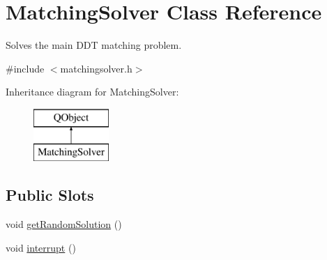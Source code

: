 \hypertarget{classMatchingSolver}{\section{Matching\-Solver Class Reference}
\label{classMatchingSolver}
}


Solves the main D\-D\-T matching problem.  




{\ttfamily \#include $<$matchingsolver.\-h$>$}

Inheritance diagram for Matching\-Solver\-:\begin{figure}[H]
\begin{center}
\leavevmode
\includegraphics[height=2.000000cm]{classMatchingSolver}
\end{center}
\end{figure}
\subsection*{Public Slots}
\begin{DoxyCompactItemize}
\item 
void \hyperlink{classMatchingSolver_afbd9f5c5ad885d89a319f751df5beaad}{get\-Random\-Solution} ()
\item 
void \hyperlink{classMatchingSolver_ac69e6c3f40d3df7c55e5ff7d307acacc}{interrupt} ()
\end{DoxyCompactItemize}
